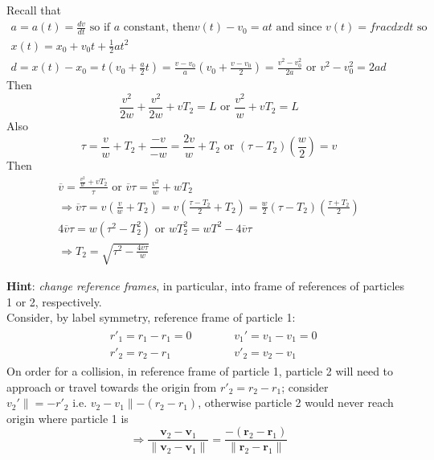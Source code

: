 Recall that
\[
\begin{gathered}
	a = a(t) = \frac{dv}{dt} \text{ so if $a$ constant, then} v(t) - v_0 = at \text{ and since } v(t) = frac{dx}{dt} \text{ so } \\
 	x(t) = x_0 + v_0t + \frac{1}{2} at^2 \\
 	d = x(t) - x_0 = t(v_0 + \frac{a}{2} t) = \frac{v- v_0}{a} (v_0 + \frac{v-v_0}{2}) = \frac{v^2 - v_0^2 }{2a } \text{ or } v^2 - v_0^2  =2ad
\end{gathered}
\]
Then 
\[
\frac{v^2}{2w} + \frac{v^2}{2w} + vT_2 = L \text{ or } \frac{v^2}{w} + vT_2 = L
\]
Also
\[
\tau = \frac{v}{w} + T_2 + \frac{-v}{-w} = \frac{2v}{w} + T_2 \text{ or } (\tau - T_2) \left( \frac{w}{2} \right) = v
\]
Then
\[
\begin{gathered}
	\overline{v} = \frac{ \frac{v^2}{w} + vT_2}{ \tau} \text{ or } \overline{v}\tau = \frac{v^2}{w} + wT_2 \\
	\Longrightarrow \overline{v}\tau = v \left( \frac{v}{w} + T_2 \right) = v ( \frac{\tau - T_2}{2} + T_2 ) = \frac{w}{2} ( \tau - T_2) ( \frac{\tau + T_2}{2} ) \\
	4\overline{v} \tau = w (\tau^2 - T_2^2) \text{ or } wT_2^2 = w T^2 - 4 \overline{v} \tau \\
	\Longrightarrow \boxed{ T_2  = \sqrt{ \tau^2 - \frac{4\overline{v} \tau}{w} } }
\end{gathered}
\]


\textbf{Hint}: \emph{change reference frames}, in particular, into frame of references of particles 1 or 2, respectively. \\
Consider, by label symmetry, reference frame of particle 1:
\[
\begin{gathered}
	\begin{aligned}
		& r'_1 = r_1- r_1 = 0 \\
		& r'_2 = r_2 - r_1 
	\end{aligned} \quad \quad \, 
	\begin{aligned}
		& v_1' = v_1 - v_1 = 0 \\
		& v'_2 = v_2 - v_1
	\end{aligned}
\end{gathered}
\]
On order for a collision, in reference frame of particle 1, particle 2 will need to approach or travel towards the origin from $r'_2=  r_2 - r_1$; consider  \\
$v_2' \parallel = -r'_2$ i.e. $v_2 - v_1 \parallel -(r_2 - r_1)$, otherwise particle 2 would never reach origin where particle 1 is
\[
\Longrightarrow \boxed{ \frac{ \textbf{v}_2-  \mathbf{v}_1}{ \| \mathbf{v}_2 - \mathbf{v}_1 \| } = \frac{ -(\mathbf{r}_2 - \mathbf{r}_1) }{ \| \mathbf{r}_2 - \mathbf{r}_1 \| } }
\]

